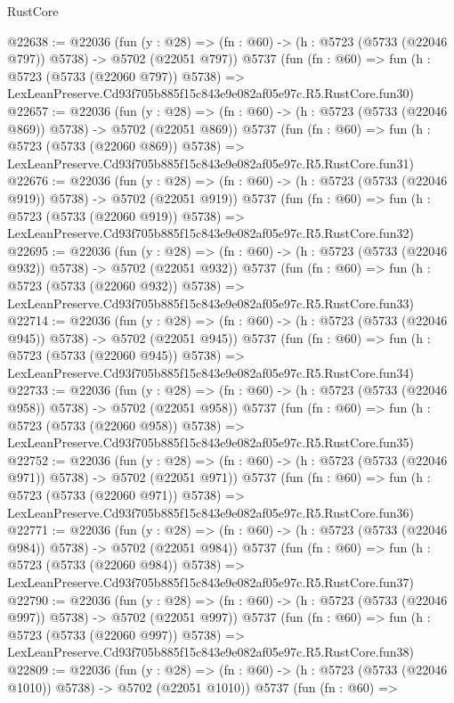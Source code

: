 \begin{lexlean}{RustCore}
\begin{coremodule}
@22638 := @22036
    (fun (y : @28) => (fn : @60) -> (h : @5723 (@5733 (@22046 @797)) @5738) -> @5702 (@22051 @797))
    @5737
    (fun (fn : @60) =>
    fun (h : @5723 (@5733 (@22060 @797)) @5738) =>
    LexLeanPreserve.Cd93f705b885f15c843e9e082af05e97c.R5.RustCore.fun30)
@22657 := @22036
    (fun (y : @28) => (fn : @60) -> (h : @5723 (@5733 (@22046 @869)) @5738) -> @5702 (@22051 @869))
    @5737
    (fun (fn : @60) =>
    fun (h : @5723 (@5733 (@22060 @869)) @5738) =>
    LexLeanPreserve.Cd93f705b885f15c843e9e082af05e97c.R5.RustCore.fun31)
@22676 := @22036
    (fun (y : @28) => (fn : @60) -> (h : @5723 (@5733 (@22046 @919)) @5738) -> @5702 (@22051 @919))
    @5737
    (fun (fn : @60) =>
    fun (h : @5723 (@5733 (@22060 @919)) @5738) =>
    LexLeanPreserve.Cd93f705b885f15c843e9e082af05e97c.R5.RustCore.fun32)
@22695 := @22036
    (fun (y : @28) => (fn : @60) -> (h : @5723 (@5733 (@22046 @932)) @5738) -> @5702 (@22051 @932))
    @5737
    (fun (fn : @60) =>
    fun (h : @5723 (@5733 (@22060 @932)) @5738) =>
    LexLeanPreserve.Cd93f705b885f15c843e9e082af05e97c.R5.RustCore.fun33)
@22714 := @22036
    (fun (y : @28) => (fn : @60) -> (h : @5723 (@5733 (@22046 @945)) @5738) -> @5702 (@22051 @945))
    @5737
    (fun (fn : @60) =>
    fun (h : @5723 (@5733 (@22060 @945)) @5738) =>
    LexLeanPreserve.Cd93f705b885f15c843e9e082af05e97c.R5.RustCore.fun34)
@22733 := @22036
    (fun (y : @28) => (fn : @60) -> (h : @5723 (@5733 (@22046 @958)) @5738) -> @5702 (@22051 @958))
    @5737
    (fun (fn : @60) =>
    fun (h : @5723 (@5733 (@22060 @958)) @5738) =>
    LexLeanPreserve.Cd93f705b885f15c843e9e082af05e97c.R5.RustCore.fun35)
@22752 := @22036
    (fun (y : @28) => (fn : @60) -> (h : @5723 (@5733 (@22046 @971)) @5738) -> @5702 (@22051 @971))
    @5737
    (fun (fn : @60) =>
    fun (h : @5723 (@5733 (@22060 @971)) @5738) =>
    LexLeanPreserve.Cd93f705b885f15c843e9e082af05e97c.R5.RustCore.fun36)
@22771 := @22036
    (fun (y : @28) => (fn : @60) -> (h : @5723 (@5733 (@22046 @984)) @5738) -> @5702 (@22051 @984))
    @5737
    (fun (fn : @60) =>
    fun (h : @5723 (@5733 (@22060 @984)) @5738) =>
    LexLeanPreserve.Cd93f705b885f15c843e9e082af05e97c.R5.RustCore.fun37)
@22790 := @22036
    (fun (y : @28) => (fn : @60) -> (h : @5723 (@5733 (@22046 @997)) @5738) -> @5702 (@22051 @997))
    @5737
    (fun (fn : @60) =>
    fun (h : @5723 (@5733 (@22060 @997)) @5738) =>
    LexLeanPreserve.Cd93f705b885f15c843e9e082af05e97c.R5.RustCore.fun38)
@22809 := @22036
    (fun (y : @28) =>
    (fn : @60) -> (h : @5723 (@5733 (@22046 @1010)) @5738) -> @5702 (@22051 @1010))
    @5737
    (fun (fn : @60) =>

\end{coremodule}
\end{lexlean}
